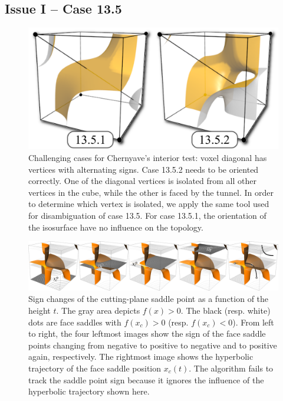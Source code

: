 \subsection{Issue I -- Case 13.5}
\label{sec:problem-case-13}

\begin{figure}[t]
     \centering
     \includegraphics[width=0.5\linewidth]{chapter4/figures/case-13.png}
     \caption{Challenging cases for Chernyave's interior test: voxel diagonal has vertices with alternating signs. Case 13.5.2 needs to be oriented correctly. One of the diagonal vertices is isolated from all other vertices in the cube, while the other is faced by the tunnel. In order to determine which vertex is isolated, we apply the same tool used for disambiguation of case 13.5. For case 13.5.1, the orientation of the isosurface have no influence on the topology. }
     \label{fig:case13}
\end{figure}

\begin{figure}[t]
     \centering
     \includegraphics[width=1\linewidth]{chapter4/figures/case13/case13.png}
     \caption{Sign changes of the cutting-plane saddle point as a function of the height $t$. The gray area depicts $f(x) > 0$. The black (resp. white) dots are face saddles with $f(x_c) > 0$ (resp. $f(x_c) < 0$). From left to right, the four leftmost images show the sign of the face saddle points changing from negative to positive to negative and to positive again, respectively. The rightmost image shows the  hyperbolic trajectory of the face saddle position $x_c(t)$. The \mc{} algorithm fails to track the saddle point sign because it ignores the influence of the hyperbolic trajectory shown here. }
     \label{fig:case13saddlesigns}
\end{figure}

